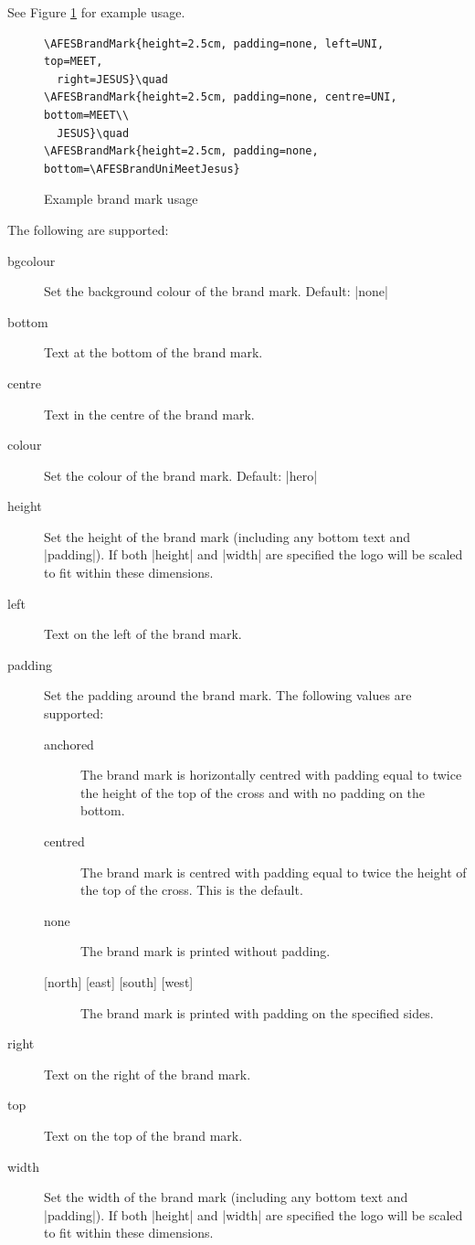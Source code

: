 \documentclass[a4paper]{l3doc}
\begin{document}
See Figure \ref{brandmark} for example usage.

\begin{figure}
  \begin{lstlisting}
\AFESBrandMark{height=2.5cm, padding=none, left=UNI, top=MEET,
  right=JESUS}\quad
\AFESBrandMark{height=2.5cm, padding=none, centre=UNI, bottom=MEET\\
  JESUS}\quad
\AFESBrandMark{height=2.5cm, padding=none, bottom=\AFESBrandUniMeetJesus}
  \end{lstlisting}

  \centering
  \quad
  \quad
  \caption{Example brand mark usage}\label{brandmark}
\end{figure}

The following  are supported:

\begin{description}
  \item[bgcolour] Set the background colour of the brand mark. Default: |none|
  \item[bottom] Text at the bottom of the brand mark.
  \item[centre] Text in the centre of the brand mark.
  \item[colour] Set the colour of the brand mark. Default: |hero|
  \item[height] Set the height of the brand mark (including any bottom text
    and |padding|). If both |height| and |width| are specified the logo will
    be scaled to fit within these dimensions.
  \item[left] Text on the left of the brand mark.
  \item[padding] Set the padding around the brand mark. The following values
    are supported:
    \begin{description}
      \item[anchored] The brand mark is horizontally centred with padding
        equal to twice the height of the top of the cross and with no padding
        on the bottom.
      \item[centred] The brand mark is centred with padding equal to twice the
        height of the top of the cross. This is the default.
      \item[none] The brand mark is printed without padding.
      \item[{[north] [east] [south] [west]}] The brand mark is printed with
        padding on the specified sides.
    \end{description}
  \item[right] Text on the right of the brand mark.
  \item[top] Text on the top of the brand mark.
  \item[width] Set the width of the brand mark (including any bottom text and
    |padding|). If both |height| and |width| are specified the logo will be
    scaled to fit within these dimensions.
\end{description}
\end{document}
